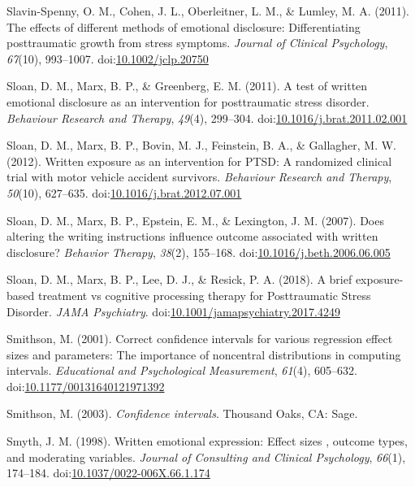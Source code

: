 \documentclass[man]{apa6}
\theoremstyle{definition}
\theoremstyle{definition}
\theoremstyle{definition}
\theoremstyle{remark}
\begin{document}
\hypertarget{ref-Slavin-Spenny2011}{}
Slavin-Spenny, O. M., Cohen, J. L., Oberleitner, L. M., \& Lumley, M. A.
(2011). The effects of different methods of emotional disclosure:
Differentiating posttraumatic growth from stress symptoms. \emph{Journal
of Clinical Psychology}, \emph{67}(10), 993--1007.
doi:\href{https://doi.org/10.1002/jclp.20750}{10.1002/jclp.20750}

\hypertarget{ref-Sloan2011a}{}
Sloan, D. M., Marx, B. P., \& Greenberg, E. M. (2011). A test of written
emotional disclosure as an intervention for posttraumatic stress
disorder. \emph{Behaviour Research and Therapy}, \emph{49}(4), 299--304.
doi:\href{https://doi.org/10.1016/j.brat.2011.02.001}{10.1016/j.brat.2011.02.001}

\hypertarget{ref-Sloan2012}{}
Sloan, D. M., Marx, B. P., Bovin, M. J., Feinstein, B. A., \& Gallagher,
M. W. (2012). Written exposure as an intervention for PTSD: A randomized
clinical trial with motor vehicle accident survivors. \emph{Behaviour
Research and Therapy}, \emph{50}(10), 627--635.
doi:\href{https://doi.org/10.1016/j.brat.2012.07.001}{10.1016/j.brat.2012.07.001}

\hypertarget{ref-Sloan2007}{}
Sloan, D. M., Marx, B. P., Epstein, E. M., \& Lexington, J. M. (2007).
Does altering the writing instructions influence outcome associated with
written disclosure? \emph{Behavior Therapy}, \emph{38}(2), 155--168.
doi:\href{https://doi.org/10.1016/j.beth.2006.06.005}{10.1016/j.beth.2006.06.005}

\hypertarget{ref-Sloan2018}{}
Sloan, D. M., Marx, B. P., Lee, D. J., \& Resick, P. A. (2018). A brief
exposure-based treatment vs cognitive processing therapy for
Posttraumatic Stress Disorder. \emph{JAMA Psychiatry}.
doi:\href{https://doi.org/10.1001/jamapsychiatry.2017.4249}{10.1001/jamapsychiatry.2017.4249}

\hypertarget{ref-Smithson2001}{}
Smithson, M. (2001). Correct confidence intervals for various regression
effect sizes and parameters: The importance of noncentral distributions
in computing intervals. \emph{Educational and Psychological
Measurement}, \emph{61}(4), 605--632.
doi:\href{https://doi.org/10.1177/00131640121971392}{10.1177/00131640121971392}

\hypertarget{ref-Smithson2003}{}
Smithson, M. (2003). \emph{Confidence intervals}. Thousand Oaks, CA:
Sage.

\hypertarget{ref-Smyth1998}{}
Smyth, J. M. (1998). Written emotional expression: Effect sizes ,
outcome types, and moderating variables. \emph{Journal of Consulting and
Clinical Psychology}, \emph{66}(1), 174--184.
doi:\href{https://doi.org/10.1037/0022-006X.66.1.174}{10.1037/0022-006X.66.1.174}
\end{document}
